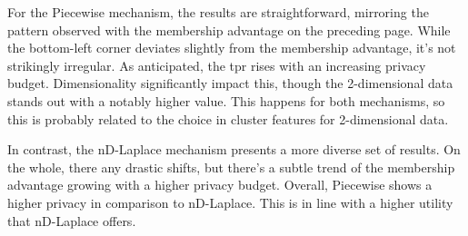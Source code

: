 For the Piecewise mechanism, the results are straightforward, mirroring the pattern observed with the membership advantage on the preceding page. While the bottom-left corner deviates slightly from the membership advantage, it's not strikingly irregular. As anticipated, the \gls{tpr} rises with an increasing privacy budget. Dimensionality  significantly impact this, though the 2-dimensional data stands out with a notably higher value.
This happens for both mechanisms, so this is probably related to the choice in cluster features for 2-dimensional data.

In contrast, the nD-Laplace mechanism presents a more diverse set of results. On the whole, there  any drastic shifts, but there's a subtle trend of the membership advantage growing with a higher privacy budget. %
Overall, Piecewise shows a higher privacy in comparison to nD-Laplace. This is in line with a higher utility that nD-Laplace offers.
\newpage


